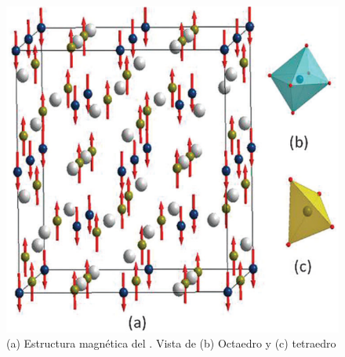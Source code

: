 \begin{figure}[h]
    \centering%
    \includegraphics[scale=0.5]{Kap1/LuIG}%
    \caption{(a) Estructura magnética del . Vista de (b) Octaedro
        y (c) tetraedro} \label{fig:luig}
\end{figure}






